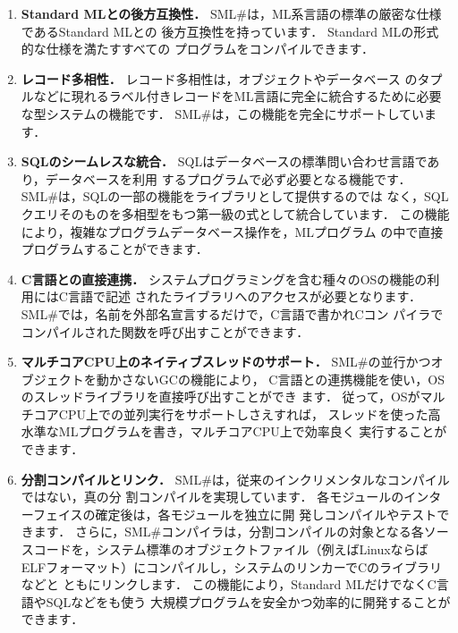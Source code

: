 \documentclass{jbook}
\newcommand{\smlsharp}{SML\#}
\begin{document}
\begin{enumerate}
\item {\bf Standard MLとの後方互換性．}
	\smlsharp{}は，ML系言語の標準の厳密な仕様であるStandard MLとの
後方互換性を持っています．
	Standard MLの形式的な仕様\cite{sml}を満たすすべての
プログラムをコンパイルできます．

\item {\bf レコード多相性．}
	レコード多相性\cite{ohor95toplas}は，オブジェクトやデータベース
のタプルなどに現れるラベル付きレコードをML言語に完全に統合するために必要
な型システムの機能です．
	\smlsharp{}は，この機能を完全にサポートしています．

\item {\bf SQLのシームレスな統合．}
	SQLはデータベースの標準問い合わせ言語であり，データベースを利用
するプログラムで必ず必要となる機能です．
	\smlsharp{}は，SQLの一部の機能をライブラリとして提供するのでは
なく，SQLクエリそのものを多相型をもつ第一級の式として統合しています．
	この機能により，複雑なプログラムデータベース操作を，MLプログラム
の中で直接プログラムすることができます．
	
\item {\bf C言語との直接連携．}
	システムプログラミングを含む種々のOSの機能の利用にはC言語で記述
されたライブラリへのアクセスが必要となります．
	\smlsharp{}では，名前を外部名宣言するだけで，C言語で書かれCコン
パイラでコンパイルされた関数を呼び出すことができます．

\item {\bf マルチコアCPU上のネイティブスレッドのサポート．}
	\smlsharp{}の並行かつオブジェクトを動かさないGCの機能により，
C言語との連携機能を使い，OSのスレッドライブラリを直接呼び出すことができ
ます．
	従って，OSがマルチコアCPU上での並列実行をサポートしさえすれば，
スレッドを使った高水準なMLプログラムを書き，マルチコアCPU上で効率良く
実行することができます．

\item {\bf 分割コンパイルとリンク．}
	\smlsharp{}は，従来のインクリメンタルなコンパイルではない，真の分
割コンパイルを実現しています．
	各モジュールのインターフェイスの確定後は，各モジュールを独立に開
発しコンパイルやテストできます．
	さらに，\smlsharp{}コンパイラは，分割コンパイルの対象となる各ソー
スコードを，システム標準のオブジェクトファイル（例えばLinuxならば
ELFフォーマット）にコンパイルし，システムのリンカーでCのライブラリなどと
ともにリンクします．
	この機能により，Standard MLだけでなくC言語やSQLなどをも使う
大規模プログラムを安全かつ効率的に開発することができます．
\end{enumerate}
\end{document}
